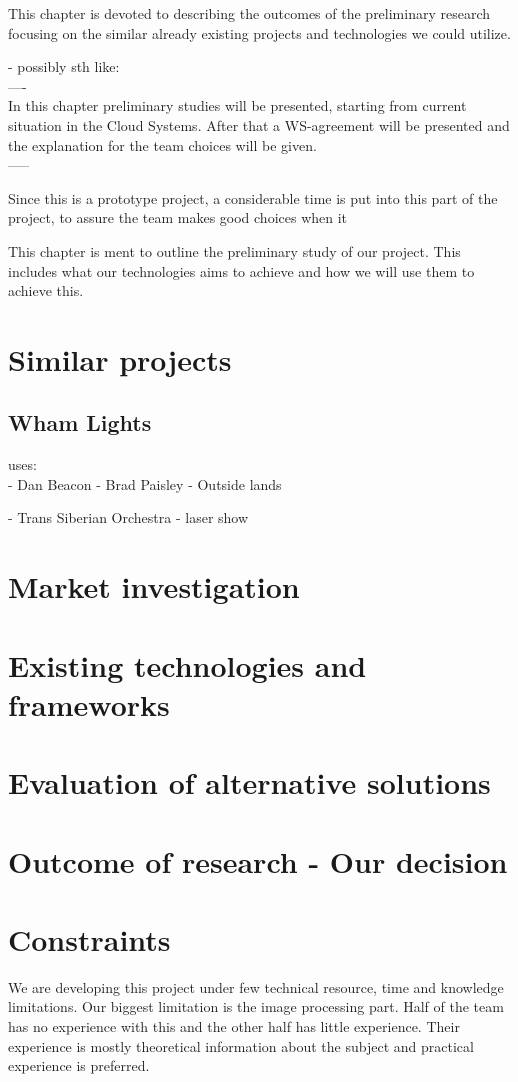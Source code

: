 This chapter is devoted to describing the outcomes of the preliminary research focusing on the similar already existing projects and technologies we could utilize.

- possibly sth like:\\
----\\
In this chapter preliminary studies will be presented, starting from current situation in the 
Cloud Systems. After that a WS-agreement will be presented and the explanation for the 
team choices will be given. \\
-----

Since this is a prototype project, a
considerable time is put into this part of the project, to assure the team makes good choices when it

This chapter is ment to outline the preliminary study of our project. This includes what our technologies
aims to achieve and how we will use them to achieve this.

\section{Similar projects}

\subsection{Wham Lights}
uses: \\
- Dan Beacon
- Brad Paisley
- Outside lands


- Trans Siberian Orchestra - laser show

\section{Market investigation}
\section{Existing technologies and frameworks}
\section{Evaluation of alternative solutions}
\section{Outcome of research - Our decision}
\section{Constraints}
We are developing this project under few technical resource, time and knowledge limitations.
Our biggest limitation is the image processing part.
Half of the team has no experience with this and the other half has little experience.
Their experience is mostly theoretical information about the subject and practical experience is preferred. 

